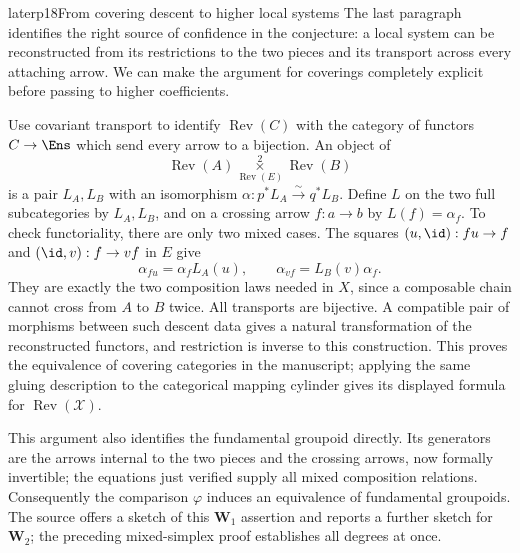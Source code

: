 \begin{dcomment}{later}{p18}{From covering descent to higher local systems}
The last paragraph identifies the right source of confidence in the conjecture: a local system can be reconstructed from its restrictions to the two pieces and its transport across every attaching arrow. We can make the argument for coverings completely explicit before passing to higher coefficients.

Use covariant transport to identify $\operatorname{Rev}(C)$ with the category of functors $C\to\Ens$ which send every arrow to a bijection. An object of
\[
 \operatorname{Rev}(A)
 \mathbin{\mathop{\times}\limits^{2}_{\operatorname{Rev}(E)}}
 \operatorname{Rev}(B)
\]
is a pair $L_A,L_B$ with an isomorphism $\alpha:p^*L_A\xrightarrow{\sim}q^*L_B$. Define $L$ on the two full subcategories by $L_A,L_B$, and on a crossing arrow $f:a\to b$ by $L(f)=\alpha_f$. To check functoriality, there are only two mixed cases. The squares $(u,\id):fu\to f$ and $(\id,v):f\to vf$ in $E$ give
\[
 \alpha_{fu}=\alpha_f L_A(u),\qquad
 \alpha_{vf}=L_B(v)\alpha_f.
\]
They are exactly the two composition laws needed in $X$, since a composable chain cannot cross from $A$ to $B$ twice. All transports are bijective. A compatible pair of morphisms between such descent data gives a natural transformation of the reconstructed functors, and restriction is inverse to this construction. This proves the equivalence of covering categories in the manuscript; applying the same gluing description to the categorical mapping cylinder gives its displayed formula for $\operatorname{Rev}(\mathcal X)$.

This argument also identifies the fundamental groupoid directly. Its generators are the arrows internal to the two pieces and the crossing arrows, now formally invertible; the equations just verified supply all mixed composition relations. Consequently the comparison $\varphi$ induces an equivalence of fundamental groupoids. The source offers a sketch of this $\mathbf W_1$ assertion and reports a further sketch for $\mathbf W_2$; the preceding mixed-simplex proof establishes all degrees at once.


\end{dcomment}
